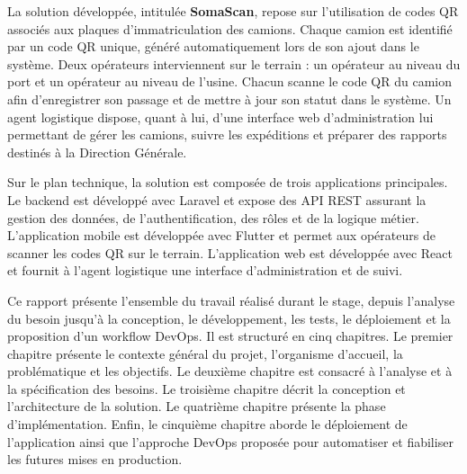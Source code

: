 La solution développée, intitulée \textbf{SomaScan}, repose sur l'utilisation de codes QR associés aux plaques d'immatriculation des camions. Chaque camion est identifié par un code QR unique, généré automatiquement lors de son ajout dans le système. Deux opérateurs interviennent sur le terrain : un opérateur au niveau du port et un opérateur au niveau de l'usine. Chacun scanne le code QR du camion afin d'enregistrer son passage et de mettre à jour son statut dans le système. Un agent logistique dispose, quant à lui, d'une interface web d'administration lui permettant de gérer les camions, suivre les expéditions et préparer des rapports destinés à la Direction Générale.

Sur le plan technique, la solution est composée de trois applications principales. Le backend est développé avec Laravel et expose des API REST assurant la gestion des données, de l'authentification, des rôles et de la logique métier. L'application mobile est développée avec Flutter et permet aux opérateurs de scanner les codes QR sur le terrain. L'application web est développée avec React et fournit à l'agent logistique une interface d'administration et de suivi.

Ce rapport présente l'ensemble du travail réalisé durant le stage, depuis l'analyse du besoin jusqu'à la conception, le développement, les tests, le déploiement et la proposition d'un workflow DevOps. Il est structuré en cinq chapitres. Le premier chapitre présente le contexte général du projet, l'organisme d'accueil, la problématique et les objectifs. Le deuxième chapitre est consacré à l'analyse et à la spécification des besoins. Le troisième chapitre décrit la conception et l'architecture de la solution. Le quatrième chapitre présente la phase d'implémentation. Enfin, le cinquième chapitre aborde le déploiement de l'application ainsi que l'approche DevOps proposée pour automatiser et fiabiliser les futures mises en production.

